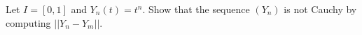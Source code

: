 \documentclass[../hw5]{subfiles}
\begin{document}
Let $I=[0,1]$ and $Y_n(t)=t^n$. Show that the sequence $(Y_n)$ is not Cauchy by computing $||Y_n-Y_m||$.
\end{document}
